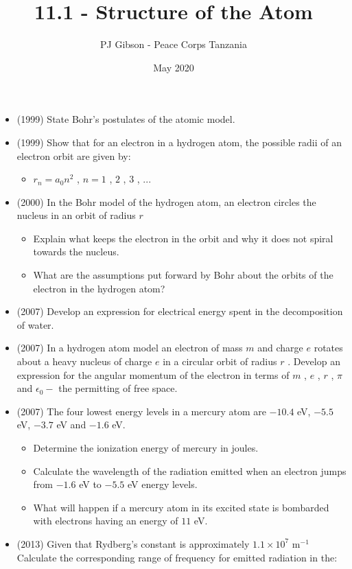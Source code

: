 \documentclass{article}
\title{\textbf{11.1 - Structure of the Atom}}
\author{PJ Gibson - Peace Corps Tanzania}
\date{May 2020}
\begin{document}
\maketitle

\begin{itemize}
\item (1999)  State Bohr’s postulates of the atomic model.
\item (1999)  Show that for an electron in a hydrogen atom, the possible radii of an electron orbit are given by:
 \begin{itemize}
\item $ r_{n}=a_{0}n^{2}$ , $ n=1$ , $ 2$ , $ 3$ , ...
\end{itemize}
\item (2000)  In the Bohr model of the hydrogen atom, an electron circles the nucleus in an orbit of radius $ r$
 \begin{itemize}
\item Explain what keeps the electron in the orbit and why it does not spiral towards the nucleus.
\item What are the assumptions put forward by Bohr about the orbits of the electron in the hydrogen atom?
\end{itemize}
\item (2007)  Develop an expression for electrical energy spent in the decomposition of water. 
\item (2007)  In a hydrogen atom model an electron of mass $ m$ and charge $ e$ rotates about a heavy nucleus of charge $ e$ in a circular orbit of radius $ r$ . Develop an expression for the angular momentum of the electron in terms of $ m$ , $ e$ , $ r$ , $ \pi$ and $ \epsilon  _{0}-$ the permitting of free space.
\item (2007)  The four lowest energy levels in a mercury atom are $ -10.4$ eV, $ -5.5$ eV, $ -3.7$ eV and $ -1.6$ eV.
 \begin{itemize}
\item Determine the ionization energy of mercury in joules. 
\item Calculate the wavelength of the radiation emitted when an electron jumps from $ -1.6$ eV to $ -5.5$ eV energy levels. 
\item What will happen if a mercury atom in its excited state is bombarded with electrons having an energy of $ 11$ eV. 
\end{itemize}
\item (2013)  Given that Rydberg’s constant is approximately $ 1.1 \times 10^{7}$ m$ ^{-1}$ Calculate the corresponding range of frequency for emitted radiation in the:

\end{itemize}
\end{document}
